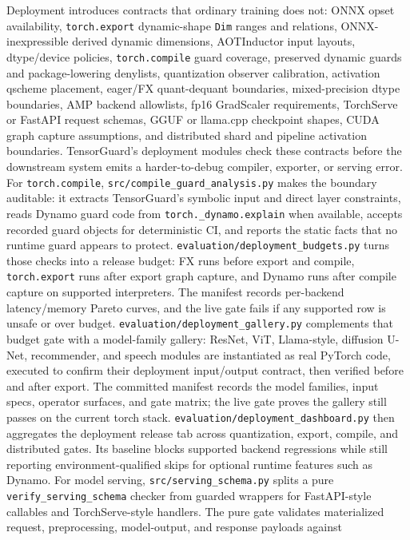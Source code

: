 \documentclass[11pt]{article}
\newcommand{\tg}{TensorGuard}
\begin{document}
Deployment introduces contracts that ordinary training does not: ONNX opset
availability, \texttt{torch.export} dynamic-shape \texttt{Dim} ranges and
relations, ONNX-inexpressible derived dynamic dimensions, AOTInductor input
layouts, dtype/device policies, \texttt{torch.compile} guard coverage,
preserved dynamic guards and package-lowering
denylists, quantization observer calibration,
activation qscheme placement, eager/FX quant-dequant boundaries,
mixed-precision dtype boundaries, AMP backend allowlists, fp16 GradScaler
requirements, TorchServe or FastAPI request schemas, GGUF or llama.cpp
checkpoint shapes, CUDA graph capture assumptions, and distributed shard
and pipeline activation boundaries.  \tg{}'s deployment modules check these contracts before the
downstream system emits a harder-to-debug compiler, exporter, or serving error.
For \texttt{torch.compile}, \texttt{src/compile\_guard\_analysis.py} makes the
boundary auditable: it extracts \tg{}'s symbolic input and direct layer
constraints, reads Dynamo guard code from \texttt{torch.\_dynamo.explain} when
available, accepts recorded guard objects for deterministic CI, and reports the
static facts that no runtime guard appears to protect.
\texttt{evaluation/deployment\_budgets.py} turns those checks into a release
budget: FX runs before export and compile, \texttt{torch.export} runs after
export graph capture, and Dynamo runs after compile capture on supported
interpreters.  The manifest records per-backend latency/memory Pareto curves, and
the live gate fails if any supported row is unsafe or over budget.
\texttt{evaluation/deployment\_gallery.py} complements that budget gate with a
model-family gallery: ResNet, ViT, Llama-style, diffusion U-Net, recommender, and
speech modules are instantiated as real PyTorch code, executed to confirm their
deployment input/output contract, then verified before and after export.  The
committed manifest records the model families, input specs, operator surfaces,
and gate matrix; the live gate proves the gallery still passes on the current
torch stack.
\texttt{evaluation/deployment\_dashboard.py} then aggregates the deployment
release tab across quantization, export, compile, and distributed gates.  Its
baseline blocks supported backend regressions while still reporting
environment-qualified skips for optional runtime features such as Dynamo.
For model serving, \texttt{src/serving\_schema.py} splits a pure
\texttt{verify\_serving\_schema} checker from guarded wrappers for
FastAPI-style callables and TorchServe-style handlers.  The pure gate validates
materialized request, preprocessing, model-output, and response payloads against
\end{document}
